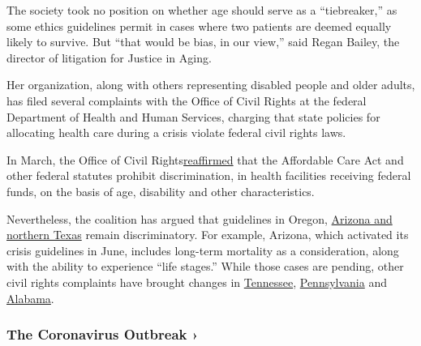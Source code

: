 The society took no position on whether age should serve as a
``tiebreaker,'' as some ethics guidelines permit in cases where two
patients are deemed equally likely to survive. But ``that would be bias,
in our view,'' said Regan Bailey, the director of litigation for Justice
in Aging.

Her organization, along with others representing disabled people and
older adults, has filed several complaints with the Office of Civil
Rights at the federal Department of Health and Human Services, charging
that state policies for allocating health care during a crisis violate
federal civil rights laws.

In March, the Office of Civil
Rights\href{https://www.hhs.gov/about/news/2020/03/28/ocr-issues-bulletin-on-civil-rights-laws-and-hipaa-flexibilities-that-apply-during-the-covid-19-emergency.html}{reaffirmed}
that the Affordable Care Act and other federal statutes prohibit
discrimination, in health facilities receiving federal funds, on the
basis of age, disability and other characteristics.

Nevertheless, the coalition has argued that guidelines in Oregon,
\href{https://www.justiceinaging.org/older-adults-and-people-with-disabilities-challenge-discriminatory-surge-care-guidelines-in-covid-19-hotspots-arizona-and-texas/}{Arizona
and northern Texas} remain discriminatory. For example, Arizona, which
activated its crisis guidelines in June, includes long-term mortality as
a consideration, along with the ability to experience ``life stages.''
While those cases are pending, other civil rights complaints have
brought changes in
\href{https://www.hhs.gov/about/news/2020/06/26/ocr-resolves-complaint-tennessee-after-it-revises-its-triage-plans-protect-against-disability.html}{Tennessee},
\href{https://www.hhs.gov/about/news/2020/04/16/ocr-resolves-civil-rights-complaint-against-pennsylvania-after-it-revises-its-pandemic-health-care.html}{Pennsylvania}
and
\href{https://www.hhs.gov/about/news/2020/04/08/ocr-reaches-early-case-resolution-alabama-after-it-removes-discriminatory-ventilator-triaging.html}{Alabama}.

\href{https://www.nytimes3xbfgragh.onion/news-event/coronavirus?action=click\&pgtype=Article\&state=default\&region=MAIN_CONTENT_3\&context=storylines_faq}{}

\hypertarget{the-coronavirus-outbreak-}{%
\subsubsection{The Coronavirus Outbreak
›}\label{the-coronavirus-outbreak-}}

